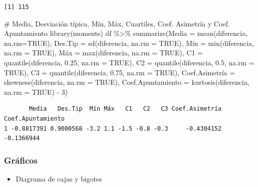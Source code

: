 \documentclass[
  a4paper,
]{scrreport}
\newenvironment{Shaded}{\begin{snugshade}}{\end{snugshade}}
\newcommand{\AttributeTok}[1]{\textcolor[rgb]{0.40,0.45,0.13}{#1}}
\newcommand{\CommentTok}[1]{\textcolor[rgb]{0.37,0.37,0.37}{#1}}
\newcommand{\ConstantTok}[1]{\textcolor[rgb]{0.56,0.35,0.01}{#1}}
\newcommand{\DecValTok}[1]{\textcolor[rgb]{0.68,0.00,0.00}{#1}}
\newcommand{\FloatTok}[1]{\textcolor[rgb]{0.68,0.00,0.00}{#1}}
\newcommand{\FunctionTok}[1]{\textcolor[rgb]{0.28,0.35,0.67}{#1}}
\newcommand{\NormalTok}[1]{\textcolor[rgb]{0.00,0.23,0.31}{#1}}
\newcommand{\OtherTok}[1]{\textcolor[rgb]{0.00,0.23,0.31}{#1}}
\newcommand{\SpecialCharTok}[1]{\textcolor[rgb]{0.37,0.37,0.37}{#1}}
\providecommand{\tightlist}{%
  \setlength{\itemsep}{0pt}\setlength{\parskip}{0pt}}\usepackage{longtable,booktabs,array}
\theoremstyle{definition}
\theoremstyle{definition}
\theoremstyle{remark}
\begin{document}
\begin{verbatim}
[1] 115
\end{verbatim}

\begin{Shaded}
\begin{Highlighting}[]
\CommentTok{\# Media, Desviación típica, Mín, Máx, Cuartiles, Coef. Asimetría y Coef. Apuntamiento}
\FunctionTok{library}\NormalTok{(moments)}
\NormalTok{df }\SpecialCharTok{\%\textgreater{}\%} \FunctionTok{summarize}\NormalTok{(}\AttributeTok{Media =} \FunctionTok{mean}\NormalTok{(diferencia, }\AttributeTok{na.rm=}\ConstantTok{TRUE}\NormalTok{), }\AttributeTok{Des.Tip =} \FunctionTok{sd}\NormalTok{(diferencia, }\AttributeTok{na.rm =} \ConstantTok{TRUE}\NormalTok{), Mín }\OtherTok{=} \FunctionTok{min}\NormalTok{(diferencia, }\AttributeTok{na.rm =} \ConstantTok{TRUE}\NormalTok{), Máx }\OtherTok{=} \FunctionTok{max}\NormalTok{(diferencia, }\AttributeTok{na.rm =} \ConstantTok{TRUE}\NormalTok{), }\AttributeTok{C1 =} \FunctionTok{quantile}\NormalTok{(diferencia, }\FloatTok{0.25}\NormalTok{, }\AttributeTok{na.rm =} \ConstantTok{TRUE}\NormalTok{), }\AttributeTok{C2 =} \FunctionTok{quantile}\NormalTok{(diferencia, }\FloatTok{0.5}\NormalTok{, }\AttributeTok{na.rm =} \ConstantTok{TRUE}\NormalTok{), }\AttributeTok{C3 =} \FunctionTok{quantile}\NormalTok{(diferencia, }\FloatTok{0.75}\NormalTok{, }\AttributeTok{na.rm =} \ConstantTok{TRUE}\NormalTok{), Coef.Asimetría }\OtherTok{=} \FunctionTok{skewness}\NormalTok{(diferencia, }\AttributeTok{na.rm =} \ConstantTok{TRUE}\NormalTok{), }\AttributeTok{Coef.Apuntamiento =} \FunctionTok{kurtosis}\NormalTok{(diferencia, }\AttributeTok{na.rm =} \ConstantTok{TRUE}\NormalTok{) }\SpecialCharTok{{-}} \DecValTok{3}\NormalTok{)}
\end{Highlighting}
\end{Shaded}

\begin{verbatim}
       Media   Des.Tip  Mín Máx   C1   C2   C3 Coef.Asimetría Coef.Apuntamiento
1 -0.8817391 0.9000568 -3.2 1.1 -1.5 -0.8 -0.3     -0.4304152        -0.1366944
\end{verbatim}

\hypertarget{gruxe1ficos-3}{%
\subsubsection{Gráficos}\label{gruxe1ficos-3}}

\begin{itemize}
\tightlist
\item
  Diagrama de cajas y bigotes
\end{itemize}
\end{document}
